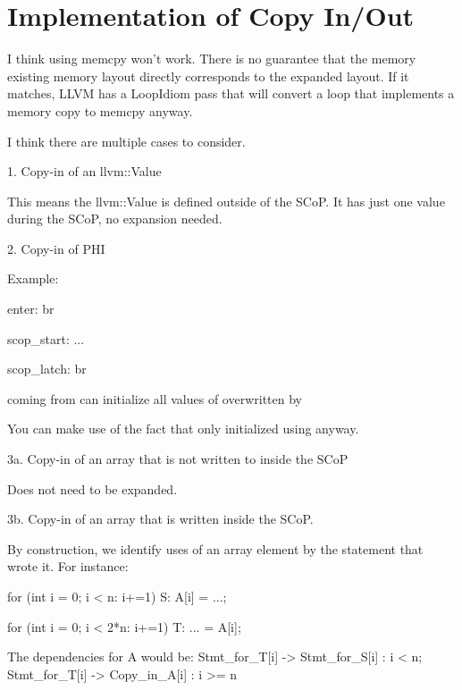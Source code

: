 \chapter{Implementation of Copy In/Out}\label{ch:CopyInOut}
I think using memcpy won't work. There is no guarantee that the memory
existing memory layout directly corresponds to the expanded layout. If
it matches, LLVM has a LoopIdiom pass that will convert a loop that
implements a memory copy to memcpy anyway.


I think there are multiple cases to consider.


1. Copy-in of an llvm::Value

This means the llvm::Value is defined outside of the SCoP. It has just
one value during the SCoP, no expansion needed.

2. Copy-in of PHI

Example:

enter:
  br %

scop_start:
  ...

scop_latch:
  br %


coming from %
can initialize all values of %
overwritten by %

You can make use of the fact that only %
initialized using %
anyway.


3a. Copy-in of an array that is not written to inside the SCoP

Does not need to be expanded.


3b. Copy-in of an array that is written inside the SCoP.

By construction, we identify uses of an array element by the statement
that wrote it. For instance:

    for (int i = 0; i < n: i+=1)
S:  A[i] = ...;

    for (int i = 0; i < 2*n: i+=1)
T:   ... = A[i];


The dependencies for A would be:
{ Stmt_for_T[i] -> Stmt_for_S[i] : i < n; Stmt_for_T[i] ->
Copy_in_A[i] : i >= n }

